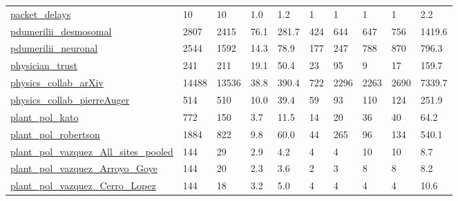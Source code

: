\begin{longtable}{llllllllll}
 \href{http://math.bu.edu/people/kolaczyk/datasets.html}{packet\_delays}                                                     & 10         & 10    & 1.0    & 1.2    & 1     & 1      & 1      & 1      & 2.2     \\
 \href{https://doi.org/10.7554/eLife.71231}{pdumerilii\_desmosomal}                                                          & 2807       & 2415  & 76.1   & 281.7  & 424   & 644    & 647    & 756    & 1419.6  \\
 \href{https://doi.org/10.1101/2020.08.21.260984}{pdumerilii\_neuronal}                                                      & 2544       & 1592  & 14.3   & 78.9   & 177   & 247    & 788    & 870    & 796.3   \\
 \href{http://konect.cc/networks/moreno_innovation}{physician\_trust}                                                        & 241        & 211   & 19.1   & 50.4   & 23    & 95     & 9      & 17     & 159.7   \\
 \href{https://manliodedomenico.com/data.php}{physics\_collab\_arXiv}                                                         & 14488      & 13536 & 38.8   & 390.4  & 722   & 2296   & 2263   & 2690   & 7339.7  \\
 \href{https://manliodedomenico.com/data.php}{physics\_collab\_pierreAuger}                                                   & 514        & 510   & 10.0   & 39.4   & 59    & 93     & 110    & 124    & 251.9   \\
 \href{https://iwdb.nceas.ucsb.edu/html/kato_1990.html}{plant\_pol\_kato}                                                     & 772        & 150   & 3.7    & 11.5   & 14    & 20     & 36     & 40     & 64.2    \\
 \href{https://iwdb.nceas.ucsb.edu/html/robertson\_1929.html}{plant\_pol\_robertson}                                           & 1884       & 822   & 9.8    & 60.0   & 44    & 265    & 96     & 134    & 540.1   \\
 \href{https://iwdb.nceas.ucsb.edu/html/vazquez_2002.html}{plant\_pol\_vazquez\_All\_sites\_pooled}                              & 144        & 29    & 2.9    & 4.2    & 4     & 4      & 10     & 10     & 8.7     \\
 \href{https://iwdb.nceas.ucsb.edu/html/vazquez_2002.html}{plant\_pol\_vazquez\_Arroyo\_Goye}                                   & 144        & 20    & 2.3    & 3.6    & 2     & 3      & 8      & 8      & 8.2     \\
 \href{https://iwdb.nceas.ucsb.edu/html/vazquez_2002.html}{plant\_pol\_vazquez\_Cerro\_Lopez}                                   & 144        & 18    & 3.2    & 5.0    & 4     & 4      & 4      & 4      & 10.6    \\

\end{longtable}
